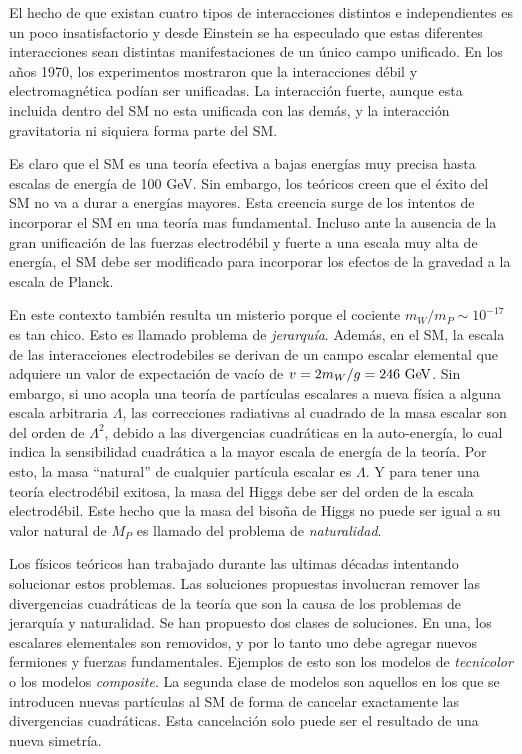 El hecho de que existan cuatro tipos de interacciones distintos e independientes
es un poco insatisfactorio y desde Einstein se ha especulado que estas
diferentes interacciones sean distintas manifestaciones de un único campo
unificado. En los a\~nos 1970, los experimentos mostraron que la interacciones
débil y electromagnética podían ser unificadas. La interacción fuerte, aunque
esta incluida dentro del SM no esta unificada con las demás, y la interacción
gravitatoria ni siquiera forma parte del SM.

Es claro que el SM es una teoría efectiva a bajas energías muy precisa hasta
escalas de energía de 100 GeV. Sin embargo, los teóricos creen que el éxito del
SM no va a durar a energías mayores. Esta creencia surge de los intentos de
incorporar el SM en una teoría mas fundamental. Incluso ante la ausencia de la
gran unificación de las fuerzas electrodébil y fuerte a una escala muy alta de
energía, el SM debe ser modificado para incorporar los efectos de la gravedad a
la escala de Planck.

En este contexto también resulta un misterio porque el cociente $m_W/m_P \sim 10^{-17}$
es tan chico. Esto es llamado problema de \emph{jerarquía}. Además, en el SM, la
escala de las interacciones electrodebiles se derivan de un campo escalar
elemental que adquiere un valor de expectación de vacío de $v = 2 m_W /g = 246
\gev$. Sin embargo, si uno acopla una teoría de partículas escalares a nueva
física a alguna escala arbitraria $\Lambda$, las correcciones radiativas al
cuadrado de la masa escalar son del orden de $\Lambda^2$, debido a las
divergencias cuadráticas en la auto-energía, lo cual indica la sensibilidad
cuadrática a la mayor escala de energía de la teoría. Por esto, la masa
``natural'' de cualquier partícula escalar es $\Lambda$. Y para tener una teoría
electrodébil exitosa, la masa del Higgs debe ser del orden de la escala
electrodébil. Este hecho que la masa del bisoña de Higgs no puede ser igual a su
valor natural de $M_P$ es llamado del problema de \emph{naturalidad}.

Los físicos teóricos han trabajado durante las ultimas décadas intentando
solucionar estos problemas. Las soluciones propuestas involucran remover las
divergencias cuadráticas de la teoría que son la causa de los problemas de
jerarquía y naturalidad. Se han propuesto dos clases de soluciones. En una, los
escalares elementales son removidos, y por lo tanto uno debe agregar nuevos
fermiones y fuerzas fundamentales. Ejemplos de esto son los modelos de
\emph{tecnicolor} o los modelos \emph{composite}. La segunda clase de modelos
son aquellos en los que se introducen nuevas partículas al SM de forma de
cancelar exactamente las divergencias cuadráticas. Esta cancelación solo puede
ser el resultado de una nueva simetría.

